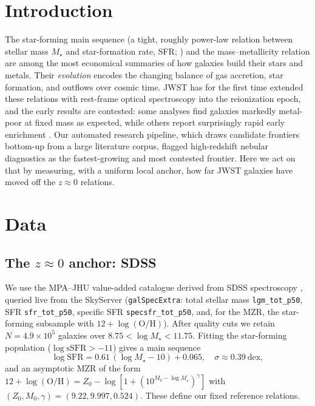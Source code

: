 \documentclass[twocolumn]{aastex631}
\begin{document}
\section{Introduction}
The star-forming main sequence (a tight, roughly power-law relation between stellar mass $M_\star$ and star-formation rate, SFR; \citealt{noeske07,speagle14}) and the mass--metallicity relation \citep{tremonti04,kewley08} are among the most economical summaries of how galaxies build their stars and metals. Their \emph{evolution} encodes the changing balance of gas accretion, star formation, and outflows over cosmic time. JWST has for the first time extended these relations with rest-frame optical spectroscopy into the reionization epoch, and the early results are contested: some analyses find galaxies markedly metal-poor at fixed mass as expected, while others report surprisingly rapid early enrichment \citep{nakajima23,curti24,sanders21}. Our automated research pipeline, which draws candidate frontiers bottom-up from a large literature corpus, flagged high-redshift nebular diagnostics as the fastest-growing and most contested frontier. Here we act on that by measuring, with a uniform local anchor, how far JWST galaxies have moved off the $z\approx0$ relations.

\section{Data}
\subsection{The $z\approx0$ anchor: SDSS}
We use the MPA--JHU value-added catalogue derived from SDSS spectroscopy \citep{brinchmann04,tremonti04}, queried live from the SkyServer (\texttt{galSpecExtra}: total stellar mass \texttt{lgm\_tot\_p50}, SFR \texttt{sfr\_tot\_p50}, specific SFR \texttt{specsfr\_tot\_p50}, and, for the MZR, the star-forming subsample with $12+\log(\mathrm{O/H})$). After quality cuts we retain $N=4.9\times10^{5}$ galaxies over $8.75<\log M_\star<11.75$. Fitting the star-forming population ($\log\mathrm{sSFR}>-11$) gives a main sequence
\begin{equation}
\log\mathrm{SFR} = 0.61\,(\log M_\star-10) + 0.065, \quad \sigma\approx0.39~\mathrm{dex},
\end{equation}
and an asymptotic MZR \citep{moustakas11} of the form $12+\log(\mathrm{O/H}) = Z_0-\log[1+(10^{M_0-\log M_\star})^{\gamma}]$ with $(Z_0,M_0,\gamma)=(9.22,9.997,0.524)$. These define our fixed reference relations.
\end{document}

